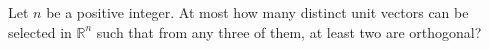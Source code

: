 Let $n$ be a positive integer. At most how many distinct unit vectors can be selected in $\mathbb{R}^n$ such that from any three of them, at least two are orthogonal?